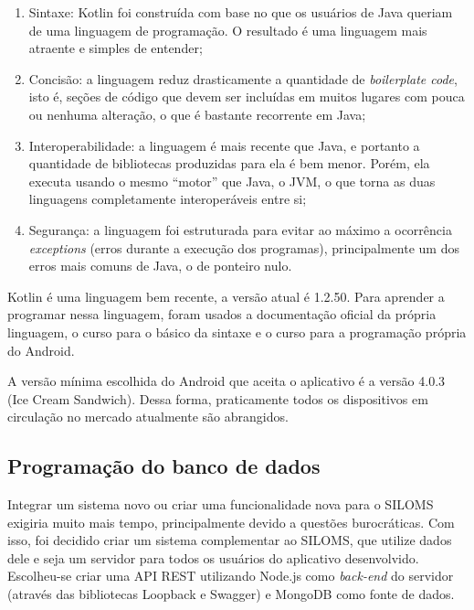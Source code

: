 \begin{enumerate}

	\item Sintaxe: Kotlin foi construída com base no que os usuários de Java queriam de uma linguagem de programação. O resultado é uma linguagem mais atraente e simples de entender;
    
	\item Concisão: a linguagem reduz drasticamente a quantidade de \textit{boilerplate code}, isto é, seções de código que devem ser incluídas em muitos lugares com pouca ou nenhuma alteração, o que é bastante recorrente em Java;
    
    \item Interoperabilidade: a linguagem é mais recente que Java, e portanto a quantidade de bibliotecas produzidas para ela é bem menor. Porém, ela executa usando o mesmo ``motor'' que Java, o JVM, o que torna as duas linguagens completamente interoperáveis entre si;
    
    \item Segurança: a linguagem foi estruturada para evitar ao máximo a ocorrência \textit{exceptions} (erros durante a execução dos programas), principalmente um dos erros mais comuns de Java, o de ponteiro nulo.
    
\end{enumerate}

Kotlin é uma linguagem bem recente, a versão atual é 1.2.50. Para aprender a programar nessa linguagem, foram usados a documentação oficial da própria linguagem, o curso \cite{kotlinbeginners} para o básico da sintaxe e o curso \cite{kotlinandroid} para a programação própria do Android.

A versão mínima escolhida do Android que aceita o aplicativo é a versão 4.0.3 (Ice Cream Sandwich). Dessa forma, praticamente todos os dispositivos em circulação no mercado atualmente são abrangidos.

\subsection{Programação do banco de dados}

Integrar um sistema novo ou criar uma funcionalidade nova para o SILOMS exigiria muito mais tempo, principalmente devido a questões burocráticas. Com isso, foi decidido criar um sistema complementar ao SILOMS, que utilize dados dele e seja um servidor para todos os usuários do aplicativo desenvolvido. Escolheu-se criar uma API REST utilizando Node.js como \textit{back-end} do servidor (através das bibliotecas Loopback e Swagger) e MongoDB como fonte de dados.

